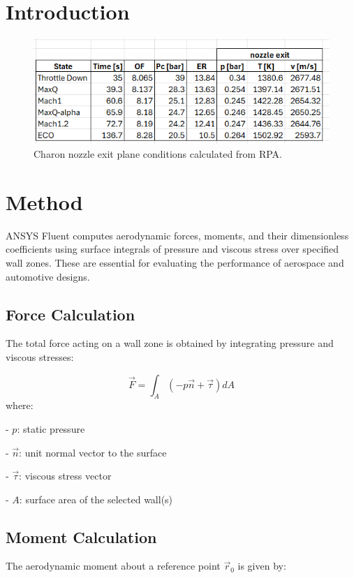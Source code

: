 \documentclass[12pt]{article}
\begin{document}
\section{Introduction}\label{sec:introduction}
%
\begin{figure}[H]
    \centering
    \includegraphics[width=\linewidth]{figs/nozzle_exit_plane.png}
    \caption{Charon nozzle exit plane conditions calculated from RPA.}
    \label{fig:vernier-force}
\end{figure}
%
\section{Method}\label{sec:method}
ANSYS Fluent computes aerodynamic forces, moments, and their dimensionless coefficients using surface integrals of pressure and viscous stress over specified wall zones. These are essential for evaluating the performance of aerospace and automotive designs.

\subsection{Force Calculation}
The total force acting on a wall zone is obtained by integrating pressure and viscous stresses:

$$
\vec{F} = \int_{A} \left( -p \vec{n} + \vec{\tau} \right) dA
$$
where:
   
- $ p $: static pressure
    
- $ \vec{n} $: unit normal vector to the surface
    
- $ \vec{\tau} $: viscous stress vector
    
- $ A $: surface area of the selected wall(s)


\subsection{Moment Calculation}
The aerodynamic moment about a reference point $\vec{r}_0$ is given by:
\end{document}
